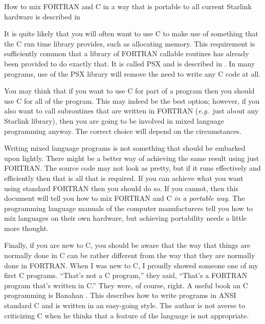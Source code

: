 \documentclass[twoside,11pt,nolof]{starlink}
\begin{document}
How to mix FORTRAN and C in a way that is portable to all current Starlink
hardware is described in



It is quite likely that you will often want to use C to make use of something
that the C run time library provides, such as allocating memory. This
requirement is sufficiently common that a library of FORTRAN callable routines
has already been provided to do exactly that.
It is called PSX and is described in
.
In many programs, use of the PSX library will remove the need to write any C
code at all.

You may think that if you want to use C for part of a program then you should
use C for all of the program. This may indeed be the best option; however, if
you also want to call subroutines that are written in FORTRAN ({\em{e.g.}}\
just about any Starlink library), then you are going to be involved in mixed
language programming anyway.
The correct choice will depend on the circumstances.

Writing mixed language programs is not something that should be embarked upon
lightly. There might be a better way of achieving the same result using just
FORTRAN\@.
The source code may not look as pretty, but if it runs effectively and
efficiently then that is all that is required. If you can achieve what you want
using standard FORTRAN then you should do so. If you cannot, then this document
will tell you how to mix FORTRAN and C \textit{in a portable way}.
The programming language manuals of the computer manufacturers tell you how to
mix languages on their own hardware, but achieving portability needs a little
more thought.

Finally, if you are new to C, you should be aware that the way that things are
normally done in C can be rather different from the way that they are normally
done in FORTRAN\@. When I was new to C, I proudly showed someone one of my first
C programs. ``That's not a C program,'' they said,  ``That's a FORTRAN program
that's written in C\@.'' They were, of course, right. A useful book an C
programming is Banahan \cite{Banahan}. This describes how to write programs in
ANSI standard C and is written in an easy-going style. The author is not averse
to criticizing C when he thinks that a feature of the language is not
appropriate.

\newpage
\end{document}
